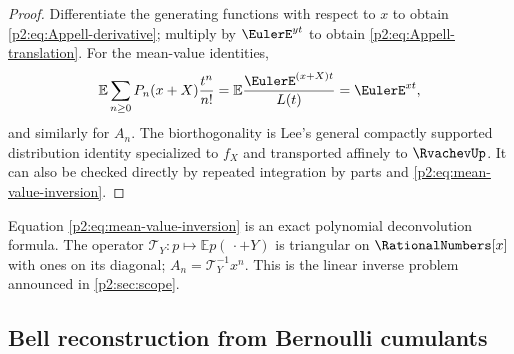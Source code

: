 \documentclass[11pt,oneside]{article}
\numberwithin{equation}{section}
\theoremstyle{definition}
\theoremstyle{remark}
\begin{document}
\begin{proof}
Differentiate the generating functions with respect to $x$ to obtain
\eqref{p2:eq:Appell-derivative}; multiply by $\EulerE^{yt}$ to obtain
\eqref{p2:eq:Appell-translation}.  For the mean-value identities,
\[
 \mathbb E\sum_{n\ge0}P_n(x+X)\frac{t^n}{n!}
 =\mathbb E\frac{\EulerE^{(x+X)t}}{L(t)}=\EulerE^{xt},
\]
and similarly for $A_n$.  The biorthogonality is Lee's general compactly supported
distribution identity specialized to $f_X$ and transported affinely to $\RvachevUp$.  It can also be checked
directly by repeated integration by parts and \eqref{p2:eq:mean-value-inversion}.
\end{proof}

\begin{remark}
Equation \eqref{p2:eq:mean-value-inversion} is an exact polynomial deconvolution formula.  The operator
$\mathcal T_Y:p\mapsto\mathbb E p(\,\cdot+Y)$ is triangular on $\RationalNumbers[x]$ with ones on its diagonal;
$A_n=\mathcal T_Y^{-1}x^n$.  This is the linear inverse problem announced in
\cref{p2:sec:scope}.
\end{remark}

\subsection{Bell reconstruction from Bernoulli cumulants}
\end{document}
